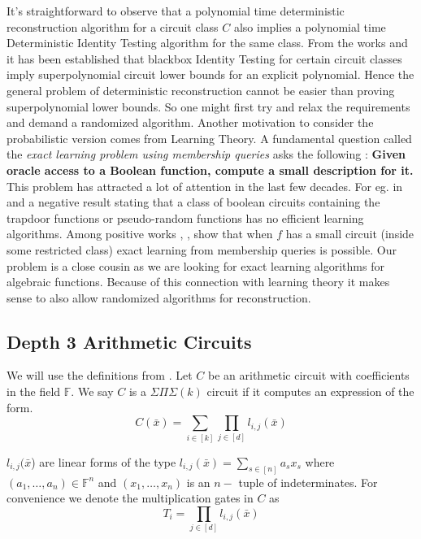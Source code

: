 \documentclass[letterpaper,USenglish,numberwithinsect]{lipics}
\newcommand{\F}{\mathbb{F}}
\newcommand{\B}[1]{\bar{#1}}
\begin{document}
It's straightforward to observe that a polynomial time
deterministic reconstruction algorithm for a circuit class $C$ also implies a
polynomial time Deterministic Identity Testing algorithm for the same class. From the works
\cite{Agr05} and \cite{HS80} it has been established that blackbox Identity Testing for certain circuit
classes imply superpolynomial circuit lower bounds for an
explicit polynomial. Hence the general problem of deterministic reconstruction
cannot be easier than proving
superpolynomial lower bounds. So one might first try and relax the requirements and demand a
randomized algorithm. Another motivation to consider the probabilistic version comes from Learning Theory.
A fundamental question called the \emph{exact learning problem using membership queries} asks
the following : {\bf Given oracle access to a Boolean
function, compute a small description for it.}
This problem has attracted a lot
of attention in the last few decades. For eg. in \cite{Khar92}\cite{OGM86} and \cite{KV94} a negative
result stating that a class of boolean
circuits containing the trapdoor functions or pseudo-random functions has no
efficient learning algorithms. Among positive works \cite{SchSe96}, \cite{BBB00}, \cite{KS06}
show that when $f$ has a small circuit (inside some restricted class) exact
learning from
membership queries is possible.   Our problem
is a close cousin as we are looking for exact learning algorithms for algebraic
functions. Because of this connection with learning theory it makes sense to
also allow randomized algorithms for reconstruction.\\



\subsection{Depth 3 Arithmetic Circuits}

We will use the definitions from \cite{KayalSa09}.
 Let $C$ be an arithmetic circuit with coefficients
in the field $\F$. We say $C$ is a
$\Sigma\Pi\Sigma(k)$ circuit if it computes an expression of the form.
\[
 C(\B{x}) = \sum\limits_{i\in [k]} \prod\limits_{j\in [d]} l_{i,j}(\B{x})
\]

$l_{i,j}(\B{x}$) are linear forms of the type $l_{i,j}(\B{x}) = \sum
\limits_{s\in[n]}a_sx_s$ where $(a_1,\ldots,a_n)\in \F ^n$ and $(x_1,\ldots,x_n)$ is
an $n-$
tuple of indeterminates.
For convenience we denote the multiplication gates in $C$ as
\[
 T_i = \prod\limits_{j\in [d]} l_{i,j}(\B{x})
\]
\end{document}
